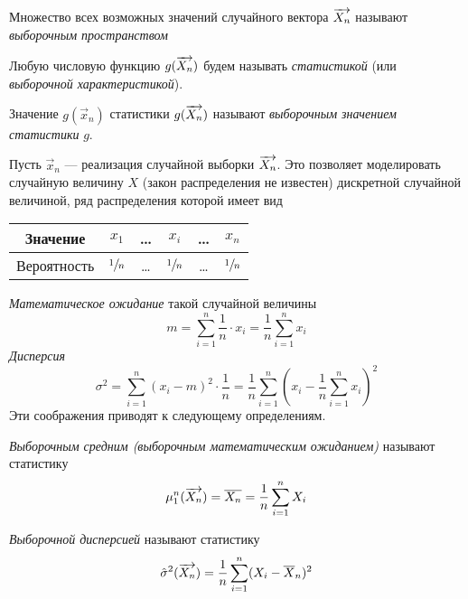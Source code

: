 \begin{defn}
		Множество всех возможных значений случайного вектора $\overrightarrow{X_n}$ называют \emph{выборочным пространством}
\end{defn}

\begin{defn}
	Любую числовую  функцию $g(\overrightarrow{X_n})$ будем называть \emph{статистикой} (или \emph{выборочной характеристикой}).
\end{defn}
\begin{rem}
	Значение $g(\vec{x}_n)$ статистики $g(\overrightarrow{X_n})$ называют \emph{выборочным значением статистики} $g$.
\end{rem}
\begin{rem}
	Пусть $\vec{x}_n$ --- реализация случайной выборки $\overrightarrow{X_n}$. Это позволяет моделировать случайную величину $X$ (закон распределения не известен) дискретной случайной величиной, ряд распределения которой имеет вид
	\begin{center}\begin{tabular}{| c || c | c | c | c | c |}
		\hline
		Значение & $x_1$ & \ldots & $x_i$ & \ldots & $x_n$ \\
		\hline
		Вероятность & $\sfrac{1}{n}$ & \ldots & $\sfrac{1}{n}$ & \ldots & $\sfrac{1}{n}$ \\
		\hline
	\end{tabular}\end{center}
	\emph{Математическое ожидание} такой случайной величины
	\[
		m = \sum_{i = 1}^{n} \frac{1}{n} \cdot x_i = \frac{1}{n} \sum_{i = 1}^{n} x_i
	\]
	\emph{Дисперсия}
	\[
		\sigma^2 = \sum_{i = 1}^{n} (x_i - m)^2 \cdot \frac{1}{n} = \frac{1}{n} \sum_{i = 1}^{n} \left(x_i - \frac{1}{n} \sum_{i = 1}^{n} x_i\right)^2
	\]
	Эти соображения приводят к следующему определениям.
\end{rem}

\begin{defn}
	\emph{Выборочным средним (выборочным математическим ожиданием)} называют статистику 
	\begin{equation}
		\mu_1^n(\overrightarrow{X_n}) = \overline{X_n} = \frac{1}{n} \sum_{i = 1}^{n} X_i
	\end{equation}
\end{defn}

\begin{defn}
	\emph{Выборочной дисперсией} называют статистику 
	\begin{equation}
		\hat{\sigma}^2(\overrightarrow{X_n}) = \frac{1}{n} \sum_{i = 1}^{n} (X_i - \overline{X}_n)^2
	\end{equation}
\end{defn}

